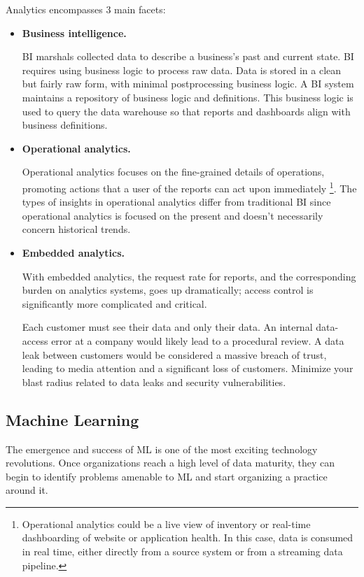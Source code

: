 Analytics encompasses 3  main facets:
\begin{itemize}
    \item \textbf{Business intelligence.}
    
    \noindent
    BI marshals collected data to describe a business's past and current
    state. BI requires using business logic to process raw data.
    Data is stored in a clean but fairly raw form,
    with minimal postprocessing business logic. A BI system maintains a repository of
    business logic and definitions. This business logic is used to query the data warehouse
    so that reports and dashboards align with business definitions.


    \item \textbf{Operational analytics.}
    
    \noindent
    Operational analytics focuses on the fine-grained details of
    operations, promoting actions that a user of the reports can act upon immediately
    \footnote{
        Operational analytics could be a live view of inventory or real-time dashboarding of
        website or application health. In this case, data is consumed in real time, either
        directly from a source system or from a streaming data pipeline.
    }.
    The types of
    insights in operational analytics differ from traditional BI since operational analytics
    is focused on the present and doesn't necessarily concern historical trends.


    \item \textbf{Embedded analytics.}
    
    \noindent
    With embedded analytics, the request rate for reports, and the corresponding burden
    on analytics systems, goes up dramatically; access control is significantly more
    complicated and critical.

    Each customer must see their data and only their
    data. An internal data-access error at a company would likely lead to a procedural
    review. A data leak between customers would be considered a massive breach of trust,
    leading to media attention and a significant loss of customers. Minimize your blast
    radius related to data leaks and security vulnerabilities.

\end{itemize}


\subsection*{Machine Learning}
The emergence and success of ML is one of the most exciting technology revolutions.
Once organizations reach a high level of data maturity, they can begin to identify
problems amenable to ML and start organizing a practice around it.

